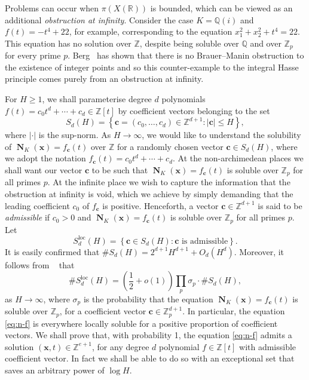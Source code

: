 \documentclass[11pt,letterpaper]{amsart}
\renewcommand{\leq}{\leqslant}
\renewcommand{\geq}{\geqslant}
\theoremstyle{definition}
\numberwithin{equation}{section}
\newcommand\RR{\mathbb{R}}
\newcommand\ZZ{\mathbb{Z}}
\newcommand\QQ{\mathbb{Q}}
\newcommand{\x}{\mathbf{x}}
\renewcommand{\c}{\mathbf{c}}
\DeclareMathOperator{\nf}{\mathbf{N}}
\newcommand{\0}{\mathbf{0}}
\begin{document}
 Problems can occur 
when $\pi(X(\RR))$ is bounded, which can be viewed  as an additional {\em obstruction at infinity}.
Consider the case $K=\QQ(i)$ and $f(t)=-t^4+22$,  for example, corresponding to the equation
$
x_1^2+x_2^2+t^4=22.
$
This equation has no solution over $\ZZ$, despite being soluble over $\QQ$ and over $\ZZ_p$ for every prime $p$.  
Berg~\cite{berg} has shown that there is no Brauer--Manin obstruction to the existence of integer points and so this counter-example to the integral Hasse principle comes purely from  an obstruction at infinity. 

For  $H\geq 1$, 
we shall  parameterise degree $d$ polynomials 
$f(t)=c_0t^d+\cdots+c_d\in \ZZ[t]$ by coefficient vectors belonging to the set
\begin{equation}\label{eq:stripe} 
S_d(H) =\left\{\c=(c_0,\dots,c_d)\in \ZZ^{d+1}: |\c|\leq H \right\},
\end{equation}
where $|\cdot|$ is the sup-norm. 
As $H\to \infty$, we would like  to  understand the solubility of 
$\nf_{K}(\mathbf{x})=f_{\mathbf{c}}(t)$ 
over $\ZZ$
 for a randomly chosen vector $\c\in S_d(H)$,
where we adopt the notation $f_{\mathbf{c}}(t)=c_0t^d+\cdots +c_d$. At the non-archimedean places we shall want our vector $\c$ to be such that $\nf_{K}(\mathbf{x})=f_{\mathbf{c}}(t)$
is  soluble over  $\ZZ_p$ for all primes $p$. At the infinite place we wish to capture the information that the 
 obstruction at infinity  is void, which we  achieve  by simply 
 demanding that the leading coefficient $c_0$ of $f_\c$ is positive. Henceforth,  
 a  vector $\c\in \ZZ^{d+1}$ is said to be {\em admissible} if $c_0>0$ and 
$\nf_{K}(\mathbf{x})=f_{\mathbf{c}}(t)$
is  soluble over $\ZZ_p$ for all primes $p$. 
Let 
\begin{equation}\label{eq:def-Sd-l}
S_d^{\text{loc}}(H)=\left\{\c\in S_d(H): \text{$\c$ is admissible}
\right\}.
\end{equation}
It is easily confirmed that 
$
\#S_d(H) =2^{d+1}H^{d+1} +O_d(H^d).
$
Moreover, 
it follows from ~\cite[Thm.~1.4]{wa} that 
\begin{equation}\label{eq:local-wa}
\#S_d^{\text{loc}}(H)=\left(\frac{1}{2}+o(1)\right)   \prod_p \sigma_p \cdot \#S_d(H)  ,
\end{equation}
as $H\to \infty$, 
where $\sigma_p$ is the probability that 
the equation $\nf_K(\x)=f_\c(t)$ is soluble over $\ZZ_p$, for a 
coefficient vector  $\c\in \ZZ_p^{d+1}$.
In particular, the equation 
\eqref{eq:n-f} is everywhere locally soluble for a positive proportion of coefficient vectors. 
We shall prove that, with probability 1, 
the equation 
\eqref{eq:n-f}
admits a solution  $(\x,t)\in \ZZ^{e+1}$, for any  degree $d$ 
polynomial $f\in \ZZ[t]$ with 
admissible coefficient vector.
 In fact we shall be able to do so with an exceptional set that saves an arbitrary power of $\log H$.
\end{document}
